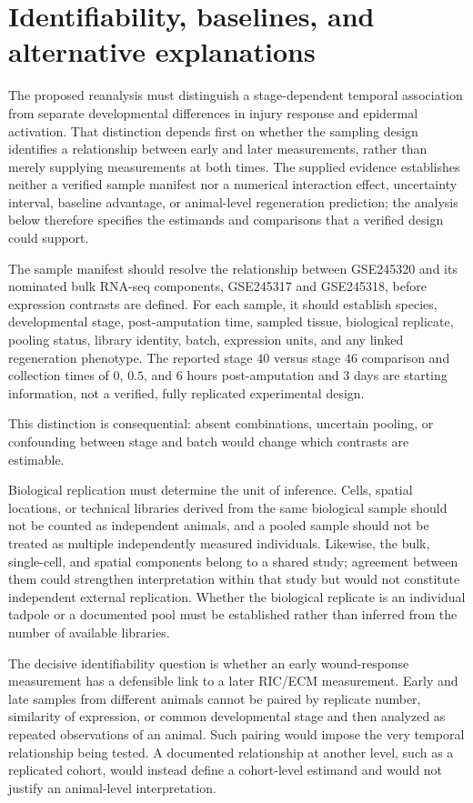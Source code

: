 \documentclass[11pt]{article}
\begin{document}
\section{Identifiability, baselines, and alternative explanations}
The proposed reanalysis must distinguish a stage-dependent temporal association from separate developmental differences in injury response and epidermal activation. That distinction depends first on whether the sampling design identifies a relationship between early and later measurements, rather than merely supplying measurements at both times. The supplied evidence establishes neither a verified sample manifest nor a numerical interaction effect, uncertainty interval, baseline advantage, or animal-level regeneration prediction; the analysis below therefore specifies the estimands and comparisons that a verified design could support.

The sample manifest should resolve the relationship between GSE245320 and its nominated bulk RNA-seq components, GSE245317 and GSE245318, before expression contrasts are defined. For each sample, it should establish species, developmental stage, post-amputation time, sampled tissue, biological replicate, pooling status, library identity, batch, expression units, and any linked regeneration phenotype. The reported stage $40$ versus stage $46$ comparison and collection times of $0$, $0.5$, and $6$ hours post-amputation and $3$ days are starting information, not a verified, fully replicated experimental design.

This distinction is consequential: absent combinations, uncertain pooling, or confounding between stage and batch would change which contrasts are estimable.

Biological replication must determine the unit of inference. Cells, spatial locations, or technical libraries derived from the same biological sample should not be counted as independent animals, and a pooled sample should not be treated as multiple independently measured individuals. Likewise, the bulk, single-cell, and spatial components belong to a shared study; agreement between them could strengthen interpretation within that study but would not constitute independent external replication. Whether the biological replicate is an individual tadpole or a documented pool must be established rather than inferred from the number of available libraries.

The decisive identifiability question is whether an early wound-response measurement has a defensible link to a later RIC/ECM measurement. Early and late samples from different animals cannot be paired by replicate number, similarity of expression, or common developmental stage and then analyzed as repeated observations of an animal. Such pairing would impose the very temporal relationship being tested. A documented relationship at another level, such as a replicated cohort, would instead define a cohort-level estimand and would not justify an animal-level interpretation.
\end{document}
